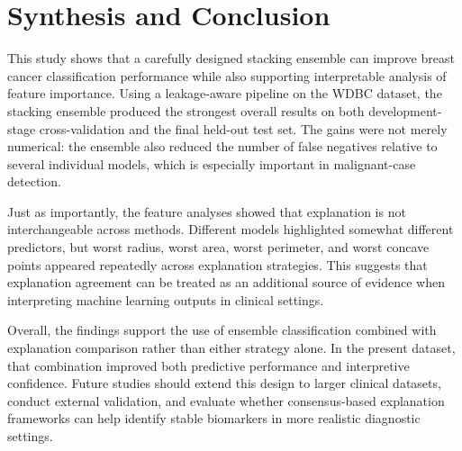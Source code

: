 \documentclass[conference]{IEEEtran}
\begin{document}
\section{Synthesis and Conclusion}
This study shows that a carefully designed stacking ensemble can improve breast cancer classification performance while also supporting interpretable analysis of feature importance. Using a leakage-aware pipeline on the WDBC dataset, the stacking ensemble produced the strongest overall results on both development-stage cross-validation and the final held-out test set. The gains were not merely numerical: the ensemble also reduced the number of false negatives relative to several individual models, which is especially important in malignant-case detection.

Just as importantly, the feature analyses showed that explanation is not interchangeable across methods. Different models highlighted somewhat different predictors, but worst radius, worst area, worst perimeter, and worst concave points appeared repeatedly across explanation strategies. This suggests that explanation agreement can be treated as an additional source of evidence when interpreting machine learning outputs in clinical settings.

Overall, the findings support the use of ensemble classification combined with explanation comparison rather than either strategy alone. In the present dataset, that combination improved both predictive performance and interpretive confidence. Future studies should extend this design to larger clinical datasets, conduct external validation, and evaluate whether consensus-based explanation frameworks can help identify stable biomarkers in more realistic diagnostic settings.
\end{document}
